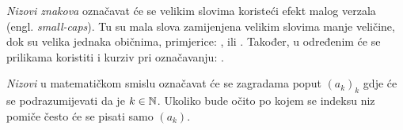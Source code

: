 \emph{Nizovi znakova} označavat će se velikim slovima 
koristeći efekt malog verzala (engl. \textit{small-caps}). 
Tu su mala slova zamijenjena velikim slovima manje veličine,
dok su velika jednaka običnima, primjerice: ,
 ili . Također, u određenim će se
prilikama koristiti i kurziv pri označavanju:
.


\emph{Nizovi} u matematičkom smislu označavat će se zagradama
poput $(a_k)_k$ gdje će se podrazumijevati da je $k \in \mathbb{N}$.
Ukoliko bude očito po kojem se indeksu niz pomiče često će se pisati
samo $(a_k)$.


